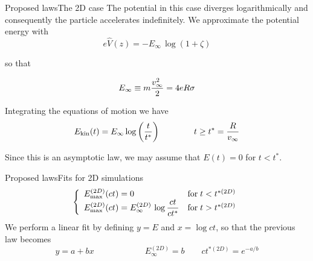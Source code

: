 \documentclass[final]{beamer}
\def\Emax{E_{\mathrm{max}}}
\def\parton#1{\left({{#1}}\right)}
\def\Ecal{{\cal E}}
\begin{document}
\begin{frame}{Proposed laws}{The 2D case}
The potential in this case diverges logarithmically and consequently the particle accelerates indefinitely. We approximate the potential energy with
%
\[ e\hat{V}(z)= - E_\infty\, \log(1+\zeta) \]

so that

\[
E_\infty\equiv m{v_\infty^2\over 2}= 4eR\sigma 
\]

Integrating the equations of motion we have
\[
  E_{\mathrm{kin}}(t)= E_\infty \log\parton{t\over t^*} \qquad \qquad t\geq t^*= {R\over v_\infty} 
\]

Since this is an asymptotic law, we may assume that $E(t)=0$ for $t<t^*$. 
\end{frame}





\begin{frame}{Proposed laws}{Fits for 2D simulations}
%
\[
\left\{
  \begin{array}{ll}
    \displaystyle \Emax^{(2D)}(ct) = 0                                   &\mathrm{for}\; t<t^{*(2D)} \\
    \displaystyle \Emax^{(2D)}(ct) = E^{(2D)}_\infty\,\log{ct\over ct^*} &\mathrm{for}\; t>t^{*(2D)}
  \end{array}
\right.
\]
%
We perform a linear fit by defining $y=E$ and $x=\log ct$, so that the previous law
becomes
%
\[ y=a+bx \qquad \qquad \qquad E^{(2D)}_\infty=b \qquad ct^{*(2D)}=e^{-a/b} \]
%
\end{frame}
\end{document}
